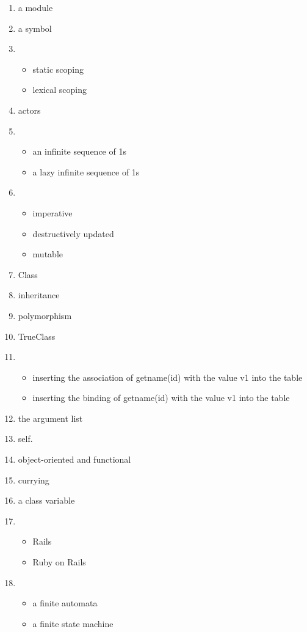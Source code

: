 \documentclass{exam}
\begin{document}
\begin{enumerate}
\begin{itemize}
\end{itemize}
\item a module
\item a symbol
\item \begin{itemize}
\item static scoping
\item lexical scoping
\end{itemize}
\item actors
\item \begin{itemize}
\item an infinite sequence of 1s
\item a lazy infinite sequence of 1s
\end{itemize}
\item \begin{itemize}
\item imperative
\item destructively updated
\item mutable
\end{itemize}
\item Class
\item inheritance
\item polymorphism
\item TrueClass
\item \begin{itemize}
\item inserting the association of getname(id) with the value v1 into the table
\item inserting the binding of getname(id) with the value v1 into the table
\end{itemize}
\item the argument list
\item self.
\item object-oriented and functional
\item currying
\item a class variable
\item \begin{itemize}
\item Rails
\item Ruby on Rails
\end{itemize}
\item \begin{itemize}
\item a finite automata
\item a finite state machine
\end{itemize}

\end{enumerate}
\end{document}
